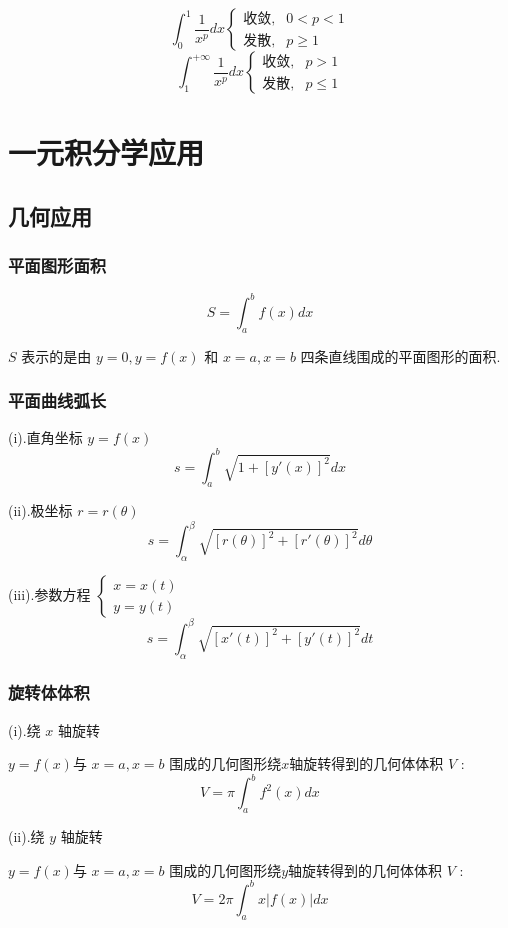 \begin{corollary}[p级数判别法]
	$$\int_{0}^{1}\frac{1}{x^{p}}dx\begin{cases} \text{收敛}, &0 < p < 1 \\ \text{发散},& p\geq 1  \end{cases}$$
	$$\int_{1}^{+\infty}\frac{1}{x^{p}}dx\begin{cases} \text{收敛}, &p > 1 \\ \text{发散},& p\leq 1  \end{cases}$$
\end{corollary}

\section{一元积分学应用}

\subsection{几何应用}
\subsubsection{平面图形面积}
\begin{definition}[定积分几何意义]
	$$S=\int_{a}^{b}f(x)dx$$

	$S$ 表示的是由 $y=0,y=f(x)$ 和 $x=a,x=b$ 四条直线围成的平面图形的面积.
\end{definition}
\subsubsection{平面曲线弧长}
\begin{theorem}[平面曲线的弧长]

	(i).直角坐标 $y=f(x)$
	$$s=\int_{a}^{b}\sqrt{1+[y'(x)]^{2}}dx$$

	(ii).极坐标 $r=r(\theta)$
	$$s=\int_{\alpha}^{\beta}\sqrt{[r(\theta)]^{2}+[r'(\theta)]^{2}}d\theta$$

	(iii).参数方程 $\left\lbrace
		\begin{array}{l}
			x=x(t) \\
			y=y(t)
		\end{array}
		\right. $
	$$s=\int_{\alpha}^{\beta}\sqrt{[x'(t)]^{2}+[y'(t)]^{2}}dt$$
\end{theorem}
\subsubsection{旋转体体积}
\begin{theorem}[旋转体体积]

	(i).绕 $x$ 轴旋转

	$y=f(x)$与 $x=a,x=b$ 围成的几何图形绕$x$轴旋转得到的几何体体积 $V$ :
	$$V=\pi\int_{a}^{b}f^{2}(x)dx$$

	(ii).绕 $y$ 轴旋转

	$y=f(x)$与 $x=a,x=b$ 围成的几何图形绕$y$轴旋转得到的几何体体积 $V$ :
	$$V=2\pi\int_{a}^{b}x|f(x)|dx$$
\end{theorem}
